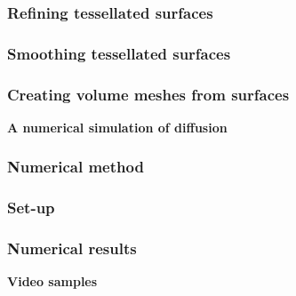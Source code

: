 \documentclass[mathserif, aspectratio=169]{beamer}
\newcommand{\mysection}[1]{\begin{frame} \begin{center} \vspace{3em} \textbf{#1} \end{center} \end{frame}}
\begin{document}
\begin{frame}
\frametitle{Refining tessellated surfaces}
\end{frame}

\begin{frame}
\frametitle{Smoothing tessellated surfaces}
\end{frame}

\begin{frame}
\frametitle{Creating volume meshes from surfaces}
\end{frame}

\mysection{A numerical simulation of diffusion}

\begin{frame}
\frametitle{Numerical method}
\end{frame}

\begin{frame}
\frametitle{Set-up}
\end{frame}

\begin{frame}
\frametitle{Numerical results}
\end{frame}


\mysection{Video samples}

\end{document}
